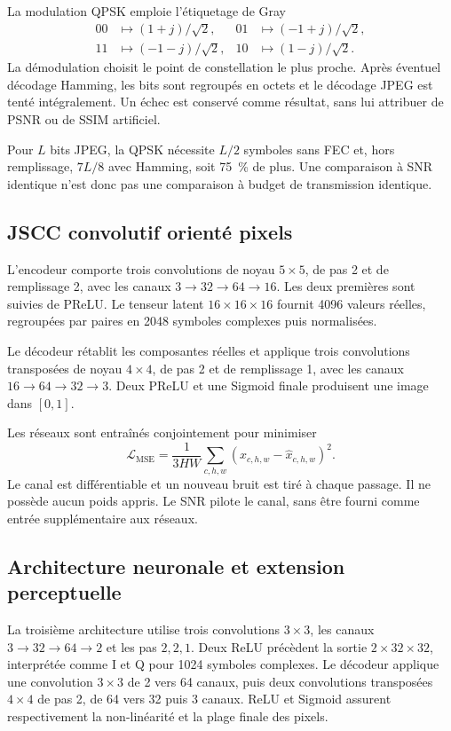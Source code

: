 \documentclass[conference]{IEEEtran}
\begin{document}
La modulation QPSK emploie l'étiquetage de Gray
\begin{equation}
\begin{aligned}
00&\mapsto(1+j)/\sqrt2, & 01&\mapsto(-1+j)/\sqrt2,\\
11&\mapsto(-1-j)/\sqrt2, & 10&\mapsto(1-j)/\sqrt2.
\end{aligned}
\end{equation}
La démodulation choisit le point de constellation le plus proche.
Après éventuel décodage Hamming, les bits sont regroupés en octets
et le décodage JPEG est tenté intégralement. Un échec est conservé
comme résultat, sans lui attribuer de PSNR ou de SSIM artificiel.

Pour $L$ bits JPEG, la QPSK nécessite $L/2$ symboles sans FEC et,
hors remplissage, $7L/8$ avec Hamming, soit 75~\% de plus. Une
comparaison à SNR identique n'est donc pas une comparaison à budget
de transmission identique.

\subsection{JSCC convolutif orienté pixels}
L'encodeur comporte trois convolutions de noyau $5\times5$, de pas 2
et de remplissage 2, avec les canaux $3\to32\to64\to16$. Les deux
premières sont suivies de PReLU. Le tenseur latent
$16\times16\times16$ fournit 4096 valeurs réelles, regroupées par
paires en 2048 symboles complexes puis normalisées.

Le décodeur rétablit les composantes réelles et applique trois
convolutions transposées de noyau $4\times4$, de pas 2 et de
remplissage 1, avec les canaux $16\to64\to32\to3$. Deux PReLU et
une Sigmoid finale produisent une image dans $[0,1]$.

Les réseaux sont entraînés conjointement pour minimiser
\begin{equation}
\mathcal L_{\mathrm{MSE}}=
\frac1{3HW}\sum_{c,h,w}(x_{c,h,w}-\widehat x_{c,h,w})^2.
\label{eq:mse}
\end{equation}
Le canal est différentiable et un nouveau bruit est tiré à chaque
passage. Il ne possède aucun poids appris. Le SNR pilote le canal,
sans être fourni comme entrée supplémentaire aux réseaux.

\subsection{Architecture neuronale et extension perceptuelle}
La troisième architecture utilise trois convolutions $3\times3$,
les canaux $3\to32\to64\to2$ et les pas $2,2,1$. Deux ReLU
précèdent la sortie $2\times32\times32$, interprétée comme I et Q
pour 1024 symboles complexes. Le décodeur applique une convolution
$3\times3$ de 2 vers 64 canaux, puis deux convolutions transposées
$4\times4$ de pas 2, de 64 vers 32 puis 3 canaux. ReLU et Sigmoid
assurent respectivement la non-linéarité et la plage finale des pixels.
\end{document}

